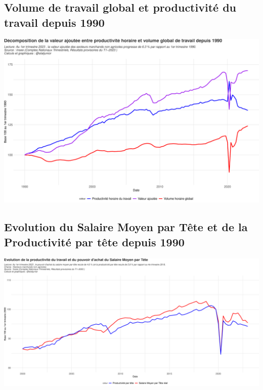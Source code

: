 \documentclass[
  paper=a4,
  ,captions=tableheading
]{scrartcl}
\begin{document}
\hypertarget{volume-de-travail-global-et-productivituxe9-du-travail-depuis-1990}{%
\subsection{Volume de travail global et productivité du travail depuis
1990}\label{volume-de-travail-global-et-productivituxe9-du-travail-depuis-1990}}

\includegraphics{rapport_pdf_compte_branche_files/figure-latex/unnamed-chunk-14-1.pdf}

\hypertarget{evolution-du-salaire-moyen-par-tuxeate-et-de-la-productivituxe9-par-tuxeate-depuis-1990}{%
\subsection{Evolution du Salaire Moyen par Tête et de la Productivité
par tête depuis
1990}\label{evolution-du-salaire-moyen-par-tuxeate-et-de-la-productivituxe9-par-tuxeate-depuis-1990}}

\includegraphics{rapport_pdf_compte_branche_files/figure-latex/unnamed-chunk-15-1.pdf}
\end{document}
